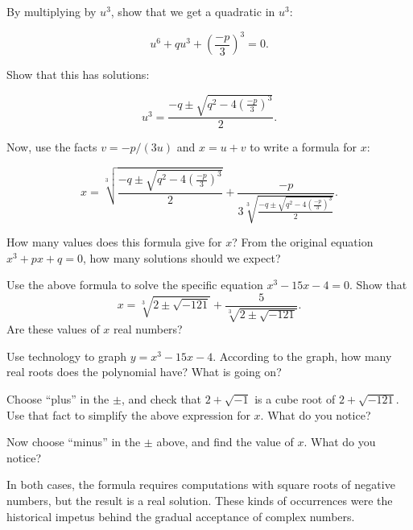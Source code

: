 \documentclass{ximera}
\begin{document}
By multiplying by $u^3$, show that we get a quadratic in $u^3$:   

$$u^6+qu^3+\left( \frac{-p}{3}\right)^3 = 0.$$

Show that this has solutions: 

$$u^3 = \frac{-q\pm\sqrt{q^2-4\left( \frac{-p}{3}\right)^3}}{2}.$$

Now, use the facts $v= -p/(3u)$ and $x = u + v$ to write a formula for $x$: 

$$x = \sqrt[3]{\frac{-q\pm\sqrt{q^2-4\left( \frac{-p}{3}\right)^3}}{2}} 
+  \frac{-p}{3\sqrt[3]{\frac{-q\pm\sqrt{q^2-4\left( \frac{-p}{3}\right)^3}}{2}}}.$$

\begin{problem}
How many values does this formula give for $x$?  From the original equation $x^3+px+q=0$, how many solutions should we expect? 
\end{problem}
\vfill

\begin{problem}
Use the above formula to solve the specific equation $x^3-15x-4=0$.  Show that $$x = \sqrt[3]{2 \pm \sqrt{-121}} + \frac{5}{\sqrt[3]{2\pm\sqrt{-121}}}.$$
Are these values of $x$ real numbers?  
\end{problem}
\vfill


\begin{problem}
Use technology to graph $y=x^3-15x-4$.  According to the graph, how many real roots does the polynomial have?  What is going on?  
\end{problem}
\vfill

\begin{problem}
Choose ``plus'' in the $\pm$, and check that $2+\sqrt{-1}$ is a cube root of $2 + \sqrt{-121}$.  Use that fact to simplify the above expression for $x$.  What do you notice?  
\end{problem}
\vfill

\begin{problem}
Now choose ``minus'' in the $\pm$ above, and find the value of $x$.  What do you notice?  
\end{problem}

\vfill
In both cases, the formula requires computations with square roots of negative numbers, but the result is a real solution.  These kinds of occurrences were the historical impetus behind the gradual acceptance of complex numbers.  
\end{document}
